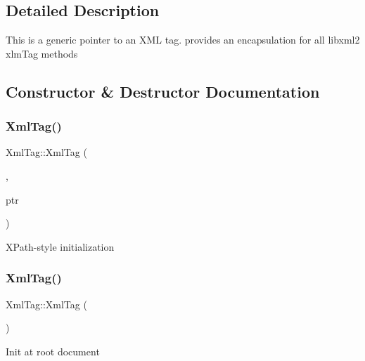\subsection{Detailed Description}
This is a generic pointer to an X\+ML tag. provides an encapsulation for all libxml2 xlm\+Tag methods 

\subsection{Constructor \& Destructor Documentation}
\mbox{\label{classXmlTag_af160832d5881c3d1fdeb173dd5278925}} 
\subsubsection{\texorpdfstring{Xml\+Tag()}{XmlTag()}\hspace{0.1cm}{\footnotesize\ttfamily [1/2]}}
{\footnotesize\ttfamily Xml\+Tag\+::\+Xml\+Tag (\begin{DoxyParamCaption}\item[{\hyperlink{XmlExtra_8h_a5956a7913c28011b6a948fbe62075f56}{xml\+Doc\+Ptr}}]{,  }\item[{\hyperlink{XmlExtra_8h_a4ad4a6885d35984ee31738a688402096}{xml\+Node\+Ptr}}]{ptr }\end{DoxyParamCaption})}

X\+Path-\/style initialization \mbox{\label{classXmlTag_a9413177ebf22e741d1d1cb14707bff63}} 
\subsubsection{\texorpdfstring{Xml\+Tag()}{XmlTag()}\hspace{0.1cm}{\footnotesize\ttfamily [2/2]}}
{\footnotesize\ttfamily Xml\+Tag\+::\+Xml\+Tag (\begin{DoxyParamCaption}\item[{\hyperlink{XmlExtra_8h_a5956a7913c28011b6a948fbe62075f56}{xml\+Doc\+Ptr}}]{ }\end{DoxyParamCaption})}

Init at root document \mbox{\label{classXmlTag_abbb5fef8e3d0dc433a6aaaf88a821d2f}} 
